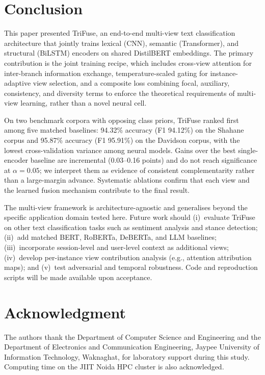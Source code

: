 \documentclass[10pt,twocolumn,a4paper]{article}
\begin{document}
\section{Conclusion}\label{sec:conclusion}

This paper presented TriFuse, an end-to-end multi-view text classification architecture that jointly trains lexical (CNN), semantic (Transformer), and structural (BiLSTM) encoders on shared DistilBERT embeddings. The primary contribution is the joint training recipe, which includes cross-view attention for inter-branch information exchange, temperature-scaled gating for instance-adaptive view selection, and a composite loss combining focal, auxiliary, consistency, and diversity terms to enforce the theoretical requirements of multi-view learning, rather than a novel neural cell.

On two benchmark corpora with opposing class priors, TriFuse ranked first among five matched baselines: 94.32\% accuracy (F1 94.12\%) on the Shahane corpus and 95.87\% accuracy (F1 95.91\%) on the Davidson corpus, with the lowest cross-validation variance among neural models. Gains over the best single-encoder baseline are incremental (0.03--0.16 points) and do not reach significance at $\alpha{=}0.05$; we interpret them as evidence of consistent complementarity rather than a large-margin advance. Systematic ablations confirm that each view and the learned fusion mechanism contribute to the final result.

The multi-view framework is architecture-agnostic and generalises beyond the specific application domain tested here. Future work should (i)~evaluate TriFuse on other text classification tasks such as sentiment analysis and stance detection; (ii)~add matched BERT, RoBERTa, DeBERTa, and LLM baselines; (iii)~incorporate session-level and user-level context as additional views; (iv)~develop per-instance view contribution analysis (e.g., attention attribution maps); and (v)~test adversarial and temporal robustness. Code and reproduction scripts will be made available upon acceptance.


\section*{Acknowledgment}
The authors thank the Department of Computer Science and Engineering and the Department of Electronics and Communication Engineering, Jaypee University of Information Technology, Waknaghat, for laboratory support during this study. Computing time on the JIIT Noida HPC cluster is also acknowledged.
\end{document}
